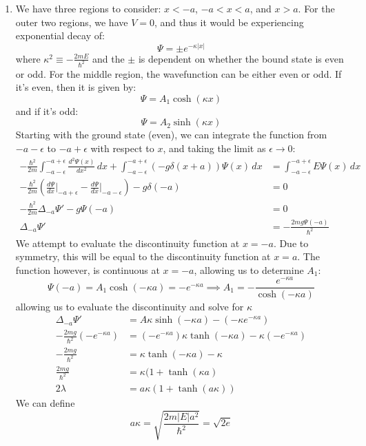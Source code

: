 \begin{sol}
\begin{enumerate}[label=\textbf{(\alph*)}]
    \item We have three regions to consider: $x<-a$, $-a<x<a$, and $x>a$. For the outer two regions, we have $V=0$, and thus it would be experiencing exponential decay of:
    $$\Psi = \pm e^{-\kappa |x|}$$
    where $\kappa^2 \equiv -\frac{2mE}{\hbar^2}$ and the $\pm$ is dependent on whether the bound state is even or odd. For the middle region, the wavefunction can be either even or odd. If it's even, then it is given by:
    $$\Psi = A_1\cosh(\kappa x)$$
    and if it's odd:
    $$\Psi = A_2\sinh(\kappa x)$$
    Starting with the ground state (even), we can integrate the function from $-a-\epsilon$ to $-a+\epsilon$ with respect to $x$, and taking the limit as $\epsilon\to 0$:
    \begin{align*}
        -\frac{\hbar^2}{2m}\int_{-a-\epsilon}^{-a+\epsilon} \frac{d^2\Psi(x)}{dx^2} \, dx + \int_{-a-\epsilon}^{-a+\epsilon} (-g\delta(x+a))\Psi(x) \, dx &= \int_{-a-\epsilon}^{-a+\epsilon} E\Psi(x) \, dx \\
        -\frac{\hbar^2}{2m}\left(\frac{d\Psi}{dx}\Big|_{-a+\epsilon}-\frac{d\Psi}{dx}\Big|_{-a-\epsilon}\right)-g\delta(-a)&=0 \\
        -\frac{\hbar^2}{2m}\Delta_{-a}\Psi'-g\Psi(-a)&=0 \\ \Delta_{-a}\Psi'&=-\frac{2mg\Psi(-a)}{\hbar^2}
    \end{align*}
We attempt to evaluate the discontinuity function at $x=-a$. Due to symmetry, this will be equal to the discontinuity function at $x=a$. The function however, is continuous at $x=-a$, allowing us to determine $A_1$:
$$\Psi(-a) = A_1\cosh(-\kappa a)=-e^{-\kappa a} \implies A_1 = -\frac{e^{-\kappa a}}{\cosh(-\kappa a)}$$
allowing us to evaluate the discontinuity and solve for $\kappa$
\begin{align*}
    \Delta_{-a}\Psi' &= A\kappa\sinh(-\kappa a)-\left(-\kappa e^{-\kappa a}\right) \\
    -\frac{2mg}{\hbar^2}\left(-e^{-\kappa a}\right)&= \left(-e^{-\kappa a}\right)\kappa \tanh(-\kappa a) - \kappa \left(-e^{-\kappa a}\right) \\
    -\frac{2mg}{\hbar^2} &= \kappa \tanh(-\kappa a) - \kappa \\
    \frac{2mg}{\hbar^2} &= \kappa(1+\tanh(\kappa a) \\
    2\lambda &= a\kappa(1+\tanh(a\kappa))
\end{align*}
We can define $$a\kappa = \sqrt{\frac{2m|E|a^2}{\hbar^2}}=\sqrt{2e}$$

\end{enumerate}
\end{sol}
